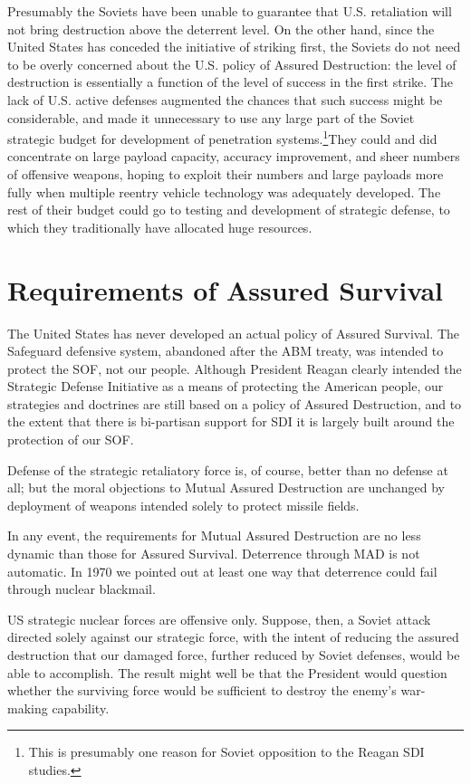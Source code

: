 Presumably the Soviets have been unable to guarantee that U.S. retaliation will not bring destruction above the deterrent level. On the other hand, since the United States has conceded the initiative of striking first, the Soviets do not need to be overly concerned about the U.S. policy of Assured Destruction: the level of destruction is essentially a function of the level of success in the first strike. The lack of U.S. active defenses augmented the chances that such success might be considerable, and made it unnecessary to use any large part of the Soviet strategic budget for development of penetration systems.\footnote{This is presumably one reason for Soviet opposition to the Reagan SDI studies.}They could and did concentrate on large payload capacity, accuracy improvement, and sheer numbers of offensive weapons, hoping to exploit their numbers and large payloads more fully when multiple reentry vehicle technology was adequately developed. The rest of their budget could go to testing and development of strategic defense, to which they traditionally have allocated huge resources.

\section{Requirements of Assured Survival}
The United States has never developed an actual policy of Assured Survival. The Safeguard defensive system, abandoned after the ABM treaty, was intended to protect the SOF, not our people. Although President Reagan clearly intended the Strategic Defense Initiative as a means of protecting the American people, our strategies and doctrines are still based on a policy of Assured Destruction, and to the extent that there is bi-partisan support for SDI it is largely built around the protection of our SOF.

Defense of the strategic retaliatory force is, of course, better than no defense at all; but the moral objections to Mutual Assured Destruction are unchanged by deployment of weapons intended solely to protect missile fields.

In any event, the requirements for Mutual Assured Destruction are no less dynamic than those for Assured Survival. Deterrence through MAD is not automatic. In 1970 we pointed out at least one way that deterrence could fail through nuclear blackmail.

US strategic nuclear forces are offensive only. Suppose, then, a Soviet attack directed solely against our strategic force, with the intent of reducing the assured destruction that our damaged force, further reduced by Soviet defenses, would be able to accomplish. The result might well be that the President would question whether the surviving force would be sufficient to destroy the enemy's war-making capability.

